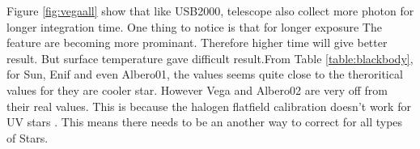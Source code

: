 \documentclass[a4paper,12pt]{article}
\begin{document}
Figure \ref{fig:vegaall} show that like USB2000, telescope also collect more photon for longer integration time. One thing to notice is that for longer exposure The feature are becoming more prominant. Therefore higher time will give better result. But surface temperature gave difficult result.From Table \ref{table:blackbody}, for Sun, Enif and even Albero01, the values seems quite close to the theroritical values for they are cooler star. However Vega and Albero02 are very off from their real values. This is because the halogen flatfield calibration doesn't work for UV stars \cite{instructions}. This means there needs to be an another way to correct for all types of Stars.


\end{document}
